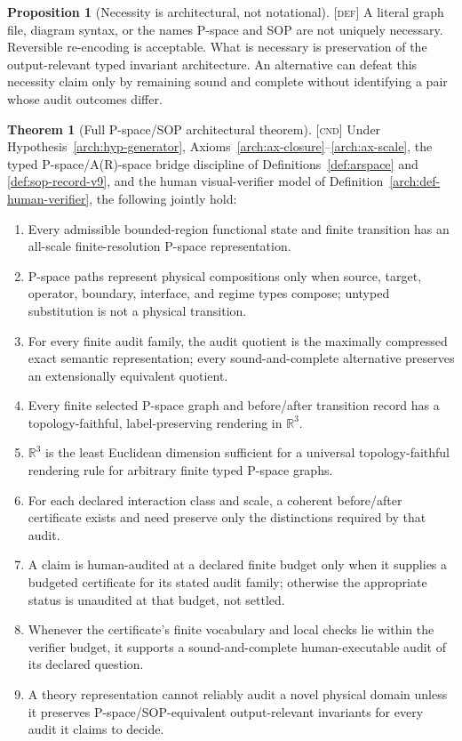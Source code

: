 \documentclass[11pt]{article}
\newcommand{\Defn}{\textsc{[def]}}
\newcommand{\Cnd}{\textsc{[cnd]}}
\theoremstyle{definition}
\newtheorem{sproposition}{Proposition}
\newtheorem{stheorem}[sdefinition]{Theorem}
\begin{document}
\begin{sproposition}[Necessity is architectural, not notational]
\label{arch:prop-notational}
\Defn{} A literal graph file, diagram syntax, or the names P-space and SOP are not
uniquely necessary. Reversible re-encoding is acceptable. What is necessary is
preservation of the output-relevant typed invariant architecture. An alternative
can defeat this necessity claim only by remaining sound and complete without
identifying a pair whose audit outcomes differ.
\end{sproposition}

\begin{stheorem}[Full P-space/SOP architectural theorem]
\label{arch:thm-full}
\Cnd{} Under Hypothesis~\ref{arch:hyp-generator},
Axioms~\ref{arch:ax-closure}--\ref{arch:ax-scale}, the typed P-space/A(R)-space
bridge discipline of Definitions~\ref{def:arspace} and \ref{def:sop-record-v9},
and the human visual-verifier model of Definition~\ref{arch:def-human-verifier},
the following jointly hold:
\begin{enumerate}[label=\textup{(F\arabic*)},leftmargin=1.45cm]
\item Every admissible bounded-region functional state and finite transition has an
all-scale finite-resolution P-space representation.
\item P-space paths represent physical compositions only when source, target,
operator, boundary, interface, and regime types compose; untyped substitution is
not a physical transition.
\item For every finite audit family, the audit quotient is the maximally compressed
exact semantic representation; every sound-and-complete alternative preserves an
extensionally equivalent quotient.
\item Every finite selected P-space graph and before/after transition record has a
topology-faithful, label-preserving rendering in $\mathbb R^3$.
\item $\mathbb R^3$ is the least Euclidean dimension sufficient for a universal
topology-faithful rendering rule for arbitrary finite typed P-space graphs.
\item For each declared interaction class and scale, a coherent before/after
certificate exists and need preserve only the distinctions required by that audit.
\item A claim is human-audited at a declared finite budget only when it supplies a
budgeted certificate for its stated audit family; otherwise the appropriate status
is unaudited at that budget, not settled.
\item Whenever the certificate's finite vocabulary and local checks lie within the
verifier budget, it supports a sound-and-complete human-executable audit of its
declared question.
\item A theory representation cannot reliably audit a novel physical domain unless
it preserves P-space/SOP-equivalent output-relevant invariants for every audit it
claims to decide.
\end{enumerate}
\end{stheorem}
\end{document}
